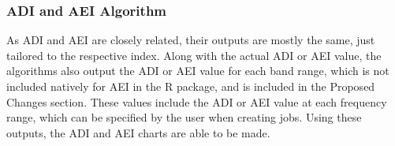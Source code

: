 \subsubsection{ADI and AEI Algorithm}
As ADI and AEI are closely related, their outputs are mostly the same, just tailored to the respective index. Along with the actual ADI or AEI value, the algorithms also output the ADI or AEI value for each band range, which is not included natively for AEI in the R package, and is included in the Proposed Changes section. These values include the ADI or AEI value at each frequency range, which can be specified by the user when creating jobs. Using these outputs, the ADI and AEI charts are able to be made.
